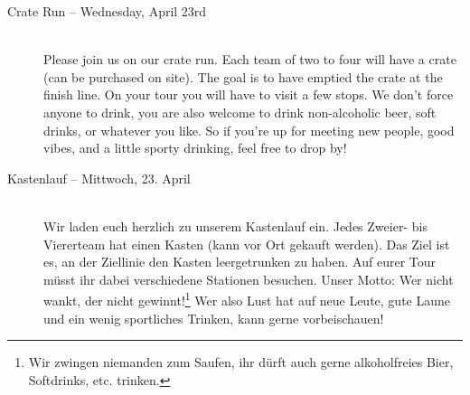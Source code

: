 \begin{description}
\ifml
\item[Crate Run -- Wednesday, April 23rd \YEAR]~\\ %
    Please join us on our crate run.
    Each team of two to four will have a crate (can be purchased on site).
    The goal is to have emptied the crate at the finish line.
    On your tour you will have to visit a few stops.
    We don't force anyone to drink, you are also welcome to drink non-alcoholic beer, soft drinks, or whatever you like.
    So if you're up for meeting new people, good vibes, and a little sporty drinking, feel free to drop by! 
\else
\item[Kastenlauf -- Mittwoch, 23. April \YEAR]~\\ %
    Wir laden euch herzlich zu unserem Kastenlauf ein.
    Jedes Zweier- bis Viererteam hat einen Kasten (kann vor Ort gekauft werden).
    Das Ziel ist es, an der Ziellinie den Kasten leergetrunken zu haben.
    Auf eurer Tour müsst ihr dabei verschiedene Stationen besuchen.
    Unser Motto: Wer nicht wankt, der nicht gewinnt!\footnote{Wir zwingen niemanden zum Saufen, ihr dürft auch gerne alkoholfreies Bier, Softdrinks, etc. trinken.}
    Wer also Lust hat auf neue Leute, gute Laune und ein wenig sportliches Trinken, kann gerne vorbeischauen! 
\fi



\end{description}
